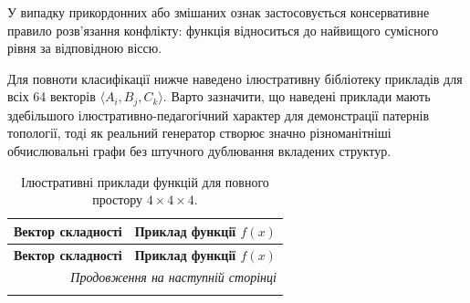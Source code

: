 \documentclass[11pt]{article}
\begin{document}
У випадку прикордонних або змішаних ознак застосовується консервативне правило розв'язання конфлікту: функція відноситься до найвищого сумісного рівня за відповідною віссю.

Для повноти класифікації нижче наведено ілюстративну бібліотеку прикладів для всіх 64 векторів $\langle A_i,B_j,C_k\rangle$. Варто зазначити, що наведені приклади мають здебільшого ілюстративно-педагогічний характер для демонстрації патернів топології, тоді як реальний генератор створює значно різноманітніші обчислювальні графи без штучного дублювання вкладених структур.

{\small
\setlength{\tabcolsep}{6pt}
\renewcommand{\arraystretch}{1.12}
\newcommand{\mcmrow}[2]{#1 & #2\\[-0.15em]\cmidrule(lr){1-2}\addlinespace[0.15em]}
\begin{longtable}{p{}p{}}
\caption{Ілюстративні приклади функцій для повного простору $4\times 4\times 4$.}\\
\toprule
\textbf{Вектор складності} & \textbf{Приклад функції $f(x)$}\\
\midrule
\endfirsthead
\toprule
\textbf{Вектор складності} & \textbf{Приклад функції $f(x)$}\\
\midrule
\endhead
\midrule
\multicolumn{2}{r}{\textit{Продовження на наступній сторінці}}\\
\midrule
\endfoot
\bottomrule
\endlastfoot


\end{longtable}}
\end{document}
